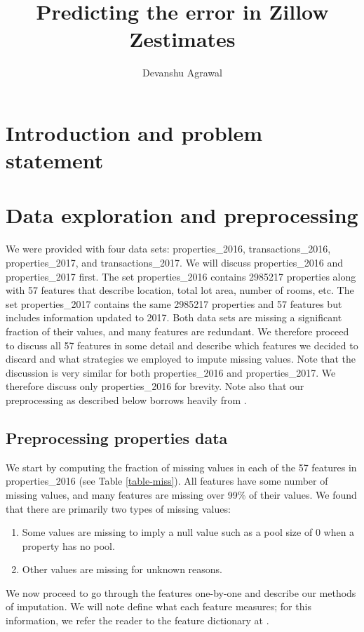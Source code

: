 \documentclass[12pt]{article}
\title{Predicting the error in Zillow Zestimates}
\author{Devanshu Agrawal}
\date{}
\begin{document}
\maketitle

\section{Introduction and problem statement}

\section{Data exploration and preprocessing}

We were provided with four data sets: properties\_2016, transactions\_2016, properties\_2017, and transactions\_2017. We will discuss properties\_2016 and properties\_2017 first. The set properties\_2016 contains 2985217 properties along with 57 features that describe location, total lot area, number of rooms, etc. The set properties\_2017 contains the same 2985217 properties and 57 features but includes information updated to 2017. Both data sets are missing a significant fraction of their values, and many features are redundant. We therefore proceed to discuss all 57 features in some detail and describe which features we decided to discard and what strategies we employed to impute missing values. Note that the discussion is very similar for both properties\_2016 and properties\_2017. We therefore discuss only properties\_2016 for brevity. Note also that our preprocessing as described below borrows heavily from \cite{rtlatimer}.

\subsection{Preprocessing properties data}
\label{section-preprocess}

We start by computing the fraction of missing values in each of the 57 features in properties\_2016 (see Table \ref{table-miss}). All features have some number of missing values, and many features are missing over 99\% of their values. We found that there are primarily two types of missing values:
\begin{enumerate}
\item Some values are missing to imply a null value such as a pool size of $0$ when a property has no pool.
\item Other values are missing for unknown reasons.
\end{enumerate}
We now proceed to go through the features one-by-one and describe our methods of imputation. We will note define what each feature measures; for this information, we refer the reader to the feature dictionary at \cite{kaggle}.
\end{document}
